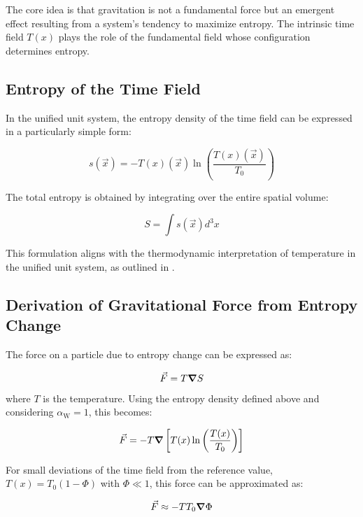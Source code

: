 \documentclass[12pt,a4paper]{article}
\newcommand{\Tfield}{T(x)}
\newcommand{\Tzero}{T_0}
\newcommand{\alphaW}{\alpha_{\text{W}}}
\newcommand{\vecx}{\vec{x}}
\begin{document}
	The core idea is that gravitation is not a fundamental force but an emergent effect resulting from a system’s tendency to maximize entropy. The intrinsic time field \(\Tfield\) plays the role of the fundamental field whose configuration determines entropy.
	
	\subsection{Entropy of the Time Field}
	In the unified unit system, the entropy density of the time field can be expressed in a particularly simple form:
	
	\begin{equation}
		s(\vecx) = -\Tfield(\vecx) \ln\left(\frac{\Tfield(\vecx)}{\Tzero}\right)
	\end{equation}
	
	The total entropy is obtained by integrating over the entire spatial volume:
	
	\begin{equation}
		S = \int s(\vecx) d^3x
	\end{equation}
	
	This formulation aligns with the thermodynamic interpretation of temperature in the unified unit system, as outlined in \cite{pascher_temp_2025}.
	
	\subsection{Derivation of Gravitational Force from Entropy Change}
	The force on a particle due to entropy change can be expressed as:
	
	\begin{equation}
		\vec{F} = T \grad S
	\end{equation}
	
	where \(T\) is the temperature. Using the entropy density defined above and considering \(\alphaW = 1\), this becomes:
	
	\begin{equation}
		\vec{F} = -T \grad\left[\Tfield \ln\left(\frac{\Tfield}{\Tzero}\right)\right]
	\end{equation}
	
	For small deviations of the time field from the reference value, \(\Tfield = \Tzero(1 - \Phi)\) with \(\Phi \ll 1\), this force can be approximated as:
	
	\begin{equation}
		\vec{F} \approx -T \Tzero \grad \Phi
	\end{equation}
	
\end{document}
